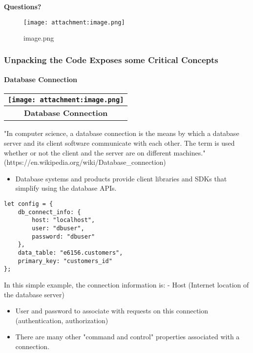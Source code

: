 \documentclass[11pt]{article}
\makeatletter
\def\maxwidth{\ifdim\Gin@nat@width>\linewidth\linewidth
    \else\Gin@nat@width\fi}
\let\Oldincludegraphics\includegraphics
\renewcommand{\includegraphics}[1]{\Oldincludegraphics[width=.8\maxwidth]{#1}}
\providecommand{\tightlist}{%
      \setlength{\itemsep}{0pt}\setlength{\parskip}{0pt}}
\makeatother
\begin{document}
    \textbf{Questions?}

\begin{figure}
\centering
\texttt{[image: attachment:image.png]}
\caption{image.png}
\end{figure}

    \subsubsection{Unpacking the Code Exposes some Critical
Concepts}\label{unpacking-the-code-exposes-some-critical-concepts}

\paragraph{Database Connection}\label{database-connection}

\begin{longtable}[]{@{}c@{}}
\toprule
\texttt{[image: attachment:image.png]}\tabularnewline
\midrule
\endhead
\textbf{Database Connection}\tabularnewline
\bottomrule
\end{longtable}

"In computer science, a database connection is the means by which a
database server and its client software communicate with each other. The
term is used whether or not the client and the server are on different
machines." (https://en.wikipedia.org/wiki/Database\_connection)

\begin{itemize}
\tightlist
\item
  Database systems and products provide client libraries and SDKs that
  simplify using the database APIs.
\end{itemize}

\begin{verbatim}
let config = {
    db_connect_info: {
        host: "localhost",
        user: "dbuser",
        password: "dbuser"
    },
    data_table: "e6156.customers",
    primary_key: "customers_id"
};
\end{verbatim}

In this simple example, the connection information is: - Host (Internet
location of the database server)

\begin{itemize}
\item
  User and password to associate with requests on this connection
  (authentication, authorization)
\item
  There are many other "command and control" properties associated with
  a connection.
\end{itemize}
\end{document}
